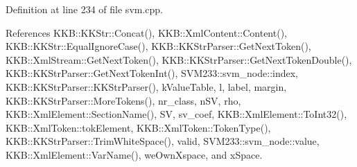 Definition at line 234 of file svm.\+cpp.



References K\+K\+B\+::\+K\+K\+Str\+::\+Concat(), K\+K\+B\+::\+Xml\+Content\+::\+Content(), K\+K\+B\+::\+K\+K\+Str\+::\+Equal\+Ignore\+Case(), K\+K\+B\+::\+K\+K\+Str\+Parser\+::\+Get\+Next\+Token(), K\+K\+B\+::\+Xml\+Stream\+::\+Get\+Next\+Token(), K\+K\+B\+::\+K\+K\+Str\+Parser\+::\+Get\+Next\+Token\+Double(), K\+K\+B\+::\+K\+K\+Str\+Parser\+::\+Get\+Next\+Token\+Int(), S\+V\+M233\+::svm\+\_\+node\+::index, K\+K\+B\+::\+K\+K\+Str\+Parser\+::\+K\+K\+Str\+Parser(), k\+Value\+Table, l, label, margin, K\+K\+B\+::\+K\+K\+Str\+Parser\+::\+More\+Tokens(), nr\+\_\+class, n\+SV, rho, K\+K\+B\+::\+Xml\+Element\+::\+Section\+Name(), SV, sv\+\_\+coef, K\+K\+B\+::\+Xml\+Element\+::\+To\+Int32(), K\+K\+B\+::\+Xml\+Token\+::tok\+Element, K\+K\+B\+::\+Xml\+Token\+::\+Token\+Type(), K\+K\+B\+::\+K\+K\+Str\+Parser\+::\+Trim\+White\+Space(), valid, S\+V\+M233\+::svm\+\_\+node\+::value, K\+K\+B\+::\+Xml\+Element\+::\+Var\+Name(), we\+Own\+Xspace, and x\+Space.


